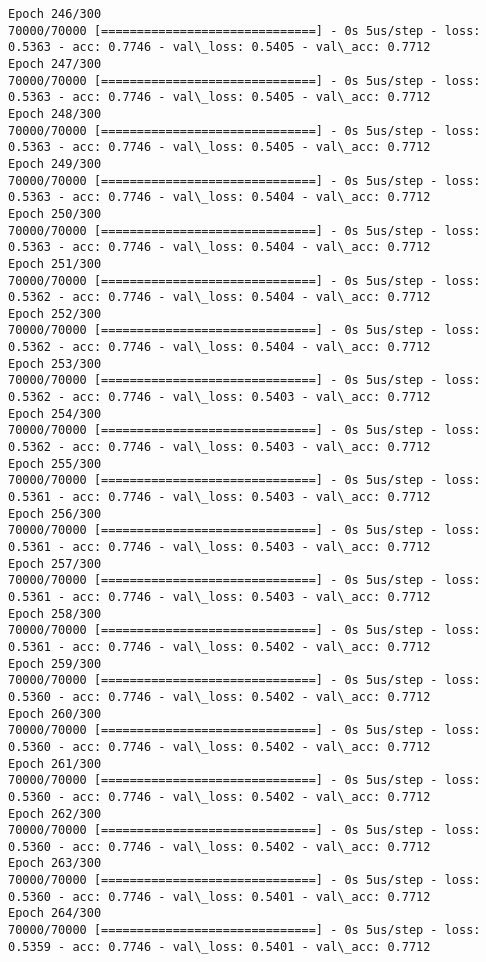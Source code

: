 \documentclass[11pt]{article}
\begin{document}
\begin{Verbatim}[commandchars=\\\{\}]
Epoch 246/300
70000/70000 [==============================] - 0s 5us/step - loss: 0.5363 - acc: 0.7746 - val\_loss: 0.5405 - val\_acc: 0.7712
Epoch 247/300
70000/70000 [==============================] - 0s 5us/step - loss: 0.5363 - acc: 0.7746 - val\_loss: 0.5405 - val\_acc: 0.7712
Epoch 248/300
70000/70000 [==============================] - 0s 5us/step - loss: 0.5363 - acc: 0.7746 - val\_loss: 0.5405 - val\_acc: 0.7712
Epoch 249/300
70000/70000 [==============================] - 0s 5us/step - loss: 0.5363 - acc: 0.7746 - val\_loss: 0.5404 - val\_acc: 0.7712
Epoch 250/300
70000/70000 [==============================] - 0s 5us/step - loss: 0.5363 - acc: 0.7746 - val\_loss: 0.5404 - val\_acc: 0.7712
Epoch 251/300
70000/70000 [==============================] - 0s 5us/step - loss: 0.5362 - acc: 0.7746 - val\_loss: 0.5404 - val\_acc: 0.7712
Epoch 252/300
70000/70000 [==============================] - 0s 5us/step - loss: 0.5362 - acc: 0.7746 - val\_loss: 0.5404 - val\_acc: 0.7712
Epoch 253/300
70000/70000 [==============================] - 0s 5us/step - loss: 0.5362 - acc: 0.7746 - val\_loss: 0.5403 - val\_acc: 0.7712
Epoch 254/300
70000/70000 [==============================] - 0s 5us/step - loss: 0.5362 - acc: 0.7746 - val\_loss: 0.5403 - val\_acc: 0.7712
Epoch 255/300
70000/70000 [==============================] - 0s 5us/step - loss: 0.5361 - acc: 0.7746 - val\_loss: 0.5403 - val\_acc: 0.7712
Epoch 256/300
70000/70000 [==============================] - 0s 5us/step - loss: 0.5361 - acc: 0.7746 - val\_loss: 0.5403 - val\_acc: 0.7712
Epoch 257/300
70000/70000 [==============================] - 0s 5us/step - loss: 0.5361 - acc: 0.7746 - val\_loss: 0.5403 - val\_acc: 0.7712
Epoch 258/300
70000/70000 [==============================] - 0s 5us/step - loss: 0.5361 - acc: 0.7746 - val\_loss: 0.5402 - val\_acc: 0.7712
Epoch 259/300
70000/70000 [==============================] - 0s 5us/step - loss: 0.5360 - acc: 0.7746 - val\_loss: 0.5402 - val\_acc: 0.7712
Epoch 260/300
70000/70000 [==============================] - 0s 5us/step - loss: 0.5360 - acc: 0.7746 - val\_loss: 0.5402 - val\_acc: 0.7712
Epoch 261/300
70000/70000 [==============================] - 0s 5us/step - loss: 0.5360 - acc: 0.7746 - val\_loss: 0.5402 - val\_acc: 0.7712
Epoch 262/300
70000/70000 [==============================] - 0s 5us/step - loss: 0.5360 - acc: 0.7746 - val\_loss: 0.5402 - val\_acc: 0.7712
Epoch 263/300
70000/70000 [==============================] - 0s 5us/step - loss: 0.5360 - acc: 0.7746 - val\_loss: 0.5401 - val\_acc: 0.7712
Epoch 264/300
70000/70000 [==============================] - 0s 5us/step - loss: 0.5359 - acc: 0.7746 - val\_loss: 0.5401 - val\_acc: 0.7712

\end{Verbatim}
\end{document}
